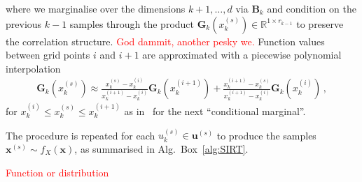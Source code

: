 where we marginalise over the dimensions $k+1 , \dots, d$ via $\bm{B}_k$ and condition on the previous $k-1$ samples through the product $\bm{G}_k(x^{(s)}_k)\in \mathbb{R}^{1 \times r_{k-1}}$ to preserve the correlation structure. \textcolor{red}{God dammit, another pesky we.}
Function values between grid points $i$ and $i+1$ are approximated with a piecewise polynomial interpolation
\begin{align}
	\bm{G}_k(x^{(s)}_k) \approx   \frac{x^{(s)}_k - x^{(i)}_k }{x^{(i+1)}_k -x^{(i)}_k } \bm{G}_k(x^{(i+1)}_k) + \frac{ x^{(i+1)}_k - x^{(s)}_k}{x^{(i+1)}_k -x^{(i)}_k } \bm{G}_k(x^{(i)}_k) \, ,
	\label{eq:LinPol}
\end{align}
for $x^{(i)}_k \leq x^{(s)}_k \leq x^{(i+1)}_k$ as in~\cite{dolgov2020approximation} for the next ``conditional marginal''.

The procedure is repeated for each $u^{(s)}_k \in \bm{u}^{(s)}$ to produce the samples $\bm{x}^{(s)} \sim f_{X}(\bm{x})$, as summarised in Alg.~Box~\ref{alg:SIRT}.%


\textcolor{red}{Function or distribution}



